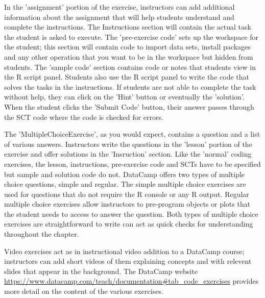 \documentclass[12pt]{article}
\begin{document}

In the 'assignment' portion of the exercise, instructors can add additional information about the assignment that will help
students understand and complete the instructions. The Instructions section will contain the actual task the student is
asked to execute. The 'pre-exercise code' sets up the workspace for the student; this section will contain code to import
data sets, install packages and any other operation that you want to be in the workspace but hidden from students. The 'sample
code' section contains code or notes that students view in the R script panel. Students also use the R script panel to write
the code that solves the tasks in the instructions. If students are not able to complete the task without help, they can click
on the 'Hint' button or eventually the 'solution'. When the student clicks the 'Submit Code' button, their answer passes through the SCT code where 
the code is checked for errors.


The 'MultipleChoiceExercise', as you would expect, contains a question and a list of various answers. Instructors write the questions in the 'lesson'
portion of the exercise and offer solutions in the 'Insruction' section. Like the 'normal' coding exercises, the lesson, instructions, pre-exercise 
code and SCTs have to be specified but sample and solution code do not. DataCamp offers two types of multiple choice questions, simple and regular. 
The simple multiple choice exercises are used for questions that do not require the R console or any R output. Regular multiple choice exercises 
allow instructors to pre-program objects or plots that the student needs to access to answer the question. Both types of multiple choice exercises 
are straightforward to write can act as quick checks for understanding throughout the chapter.


Video exercises act as in instructional video addition to a DataCamp course; instructors can add short videos of them explaining concepts and with 
relevent slides that appear in the background. The DataCamp website \url{https://www.datacamp.com/teach/documentation#tab_code_exercises} provides 
more detail on the content of the various exercises. 







%


\end{document}
